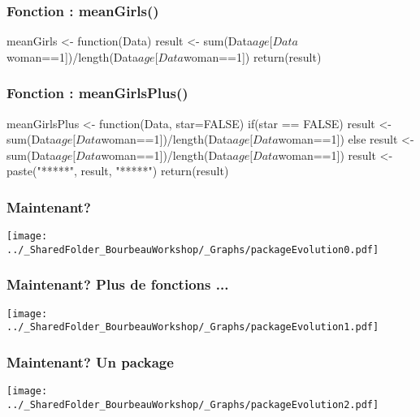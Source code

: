 \documentclass{beamer}
\begin{document}
    \begin{frame}[fragile=singleslide]
        \frametitle{Fonction \R: meanGirls()}
        \begin{code}
meanGirls <- function(Data){
    result <- sum(Data$age[Data$woman==1])/length(Data$age[Data$woman==1])
    return(result)
}
        \end{code}
    \end{frame}


    \begin{frame}[fragile=singleslide]
        \frametitle{Fonction \R : meanGirlsPlus()}
        \begin{code}
meanGirlsPlus <- function(Data, star=FALSE){
    if(star == FALSE){
        result <- sum(Data$age[Data$woman==1])/length(Data$age[Data$woman==1])
    } else {
        result <- sum(Data$age[Data$woman==1])/length(Data$age[Data$woman==1])
        result <- paste("*****", result, "*****")
    }    
    return(result)
}
        \end{code}
    \end{frame}
    
    \begin{frame}
        \frametitle{Maintenant?} \vspace{1cm}
        \begin{center}
            \texttt{[image: ../\_SharedFolder\_BourbeauWorkshop/\_Graphs/packageEvolution0.pdf]}
        \end{center}
    \end{frame} 
    
    \begin{frame}
        \frametitle{Maintenant? Plus de fonctions \R ...} \vspace{1cm}
        \begin{center}
            \texttt{[image: ../\_SharedFolder\_BourbeauWorkshop/\_Graphs/packageEvolution1.pdf]}
        \end{center}
    \end{frame} 
    
    \begin{frame}
        \frametitle{Maintenant? Un package \R} \vspace{1cm}
        \begin{center}
            \texttt{[image: ../\_SharedFolder\_BourbeauWorkshop/\_Graphs/packageEvolution2.pdf]}
        \end{center}
    \end{frame} 
    
\end{document}
